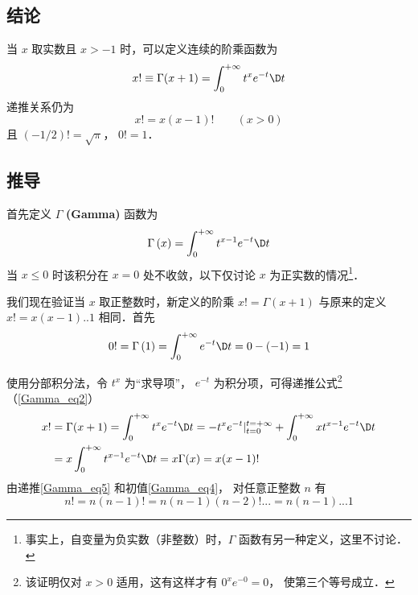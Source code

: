 

\subsection{结论}
当 $x$ 取实数且 $x>-1$ 时，可以定义连续的阶乘函数为
\begin{equation}
x! \equiv \Gamma (x + 1) = \int_0^{ + \infty } {{t^x}{e^{ - t}}\D t} 
\end{equation}
递推关系仍为
\begin{equation}\label{Gamma_eq2}
x!=x(x-1)! \qquad (x>0)
\end{equation}
且 $(-1/2)!=\sqrt{\pi}$，  $0! = 1$．

\subsection{推导}

首先定义 $\Gamma$ \textbf{(Gamma)} 函数为
\begin{equation}
\Gamma \left( x \right) = \int_0^{ + \infty } {{t^{x - 1}}{e^{ - t}}\D t} 
\end{equation}
当 $x \le 0$ 时该积分在 $x=0$ 处不收敛，以下仅讨论 $x$ 为正实数的情况\footnote{事实上，自变量为负实数（非整数）时，$\Gamma$ 函数有另一种定义，这里不讨论．}．

我们现在验证当 $x$ 取正整数时，新定义的阶乘 $x! = \Gamma(x+1)$ 与原来的定义 $x! = x(x-1)..1$ 相同．首先
\begin{equation}\label{Gamma_eq4}
0! = \Gamma \left( 1 \right) = \int_0^{ + \infty } {e^{ - t}\D t} = 0-(-1) = 1
\end{equation}

使用分部积分法，令 ${t^x}$ 为“求导项”， ${e^{ - t}}$ 为积分项，可得递推公式\footnote{该证明仅对 $x>0$ 适用，这有这样才有 $0^x e^{-0}=0$， 使第三个等号成立．}（\autoref{Gamma_eq2}）
\begin{equation}\label{Gamma_eq5}
\begin{aligned}
x! &= \Gamma ( x+1) = \int_0^{ + \infty } {{t^x}{e^{ - t}}\D t} =  - {t^x}{e^{ - t}}|_{t = 0}^{t =  + \infty } + \int_0^{ + \infty } {x{t^{x - 1}}{e^{ - t}}\D t} \\
&= x\int_0^{ + \infty } {{t^{x - 1}}{e^{ - t}}\D t} = x\Gamma (x) = x(x-1)!
\end{aligned} \end{equation} 
由递推\autoref{Gamma_eq5} 和初值\autoref{Gamma_eq4}， 对任意正整数 $n$ 有
\begin{equation}
n! = n(n-1)! = n(n-1)(n-2)!... = n(n-1)...1
\end{equation}

